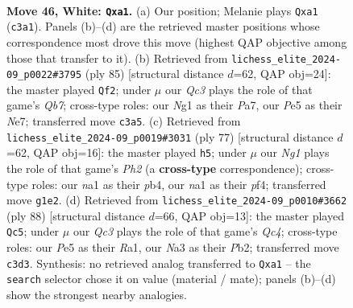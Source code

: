 \documentclass[11pt]{article}
\begin{document}
\clearpage

\begin{figure}[p]\centering
\begin{subfigure}{0.46\textwidth}\centering
\resizebox{\linewidth}{!}{%
\newchessgame
\chessboard[
  setfen={4n3/1q1b2k1/p7/4Pp1p/3P2p1/N1Q5/5PPP/n3K1N1 w - - 0 46},
  showmover=false,
  pgfstyle=straightmove, color=movearrow, markmove={c3-a1}
]}
\caption{}
\end{subfigure}\hfill
\begin{subfigure}{0.46\textwidth}\centering
\resizebox{\linewidth}{!}{%
\newchessgame
\chessboard[
  setfen={8/p3npk1/7p/1p2P3/2p1QP2/2P4P/Pq6/6NK b - - 3 43},
  showmover=false,
  pgfstyle=straightmove, color=movearrow, markmove={b2-f2}
]}
\caption{}
\end{subfigure}
\\[4pt]
\begin{subfigure}{0.46\textwidth}\centering
\resizebox{\linewidth}{!}{%
\newchessgame
\chessboard[
  setfen={5k2/2pn2pp/3q1p2/1p6/1P2PP2/1Q2B2P/6P1/6K1 b - - 4 39},
  showmover=false,
  pgfstyle=straightmove, color=movearrow, markmove={h7-h5}
]}
\caption{}
\end{subfigure}\hfill
\begin{subfigure}{0.46\textwidth}\centering
\resizebox{\linewidth}{!}{%
\newchessgame
\chessboard[
  setfen={4q2k/1b4p1/2p4p/1n2p3/2Q1P3/5PP1/1P4P1/R5K1 w - - 14 45},
  showmover=false,
  pgfstyle=straightmove, color=movearrow, markmove={c4-c5}
]}
\caption{}
\end{subfigure}
\caption{\textbf{Move 46, White: \texttt{Qxa1}.} (a) Our position; Melanie plays \texttt{Qxa1} (\texttt{c3a1}). Panels (b)--(d) are the retrieved master positions whose correspondence most drove this move (highest QAP objective among those that transfer to it). (b) Retrieved from \texttt{lichess\_elite\_2024-09\_p0022\#3795} (ply 85) [structural distance $d$=62, QAP obj=24]: the master played \texttt{Qf2}; under $\mu$ our \emph{Qc3} plays the role of that game's \emph{Qb7}; cross-type roles: our \emph{N}g1 as their \emph{P}a7, our \emph{P}e5 as their \emph{N}e7; transferred move \texttt{c3a5}. (c) Retrieved from \texttt{lichess\_elite\_2024-09\_p0019\#3031} (ply 77) [structural distance $d$=62, QAP obj=16]: the master played \texttt{h5}; under $\mu$ our \emph{Ng1} plays the role of that game's \emph{Ph2} (a \textbf{cross-type} correspondence); cross-type roles: our \emph{n}a1 as their \emph{p}b4, our \emph{n}a1 as their \emph{p}f4; transferred move \texttt{g1e2}. (d) Retrieved from \texttt{lichess\_elite\_2024-09\_p0010\#3662} (ply 88) [structural distance $d$=66, QAP obj=13]: the master played \texttt{Qc5}; under $\mu$ our \emph{Qc3} plays the role of that game's \emph{Qc4}; cross-type roles: our \emph{P}e5 as their \emph{R}a1, our \emph{N}a3 as their \emph{P}b2; transferred move \texttt{c3d3}. Synthesis: no retrieved analog transferred to \texttt{Qxa1} -- the \texttt{search} selector chose it on value (material / mate); panels (b)--(d) show the strongest nearby analogies.}
\label{fig:thought-m90}
\end{figure}
\end{document}
